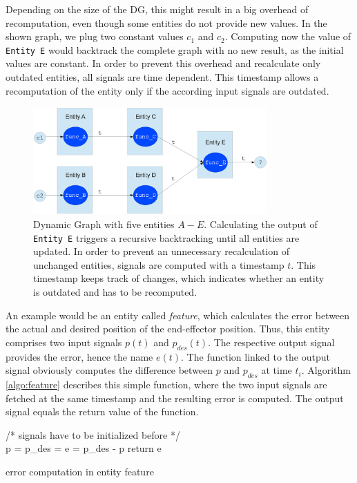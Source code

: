Depending on the size of the DG, this might result in a big overhead of recomputation, even though some entities do not provide new values. In the shown graph, we plug two constant values $c_1$ and $c_2$. Computing now the value of \verb|Entity E| would backtrack the complete graph with no new result, as the initial values are constant. In order to prevent this overhead and recalculate only outdated entities, all signals are time dependent. This timestamp allows a recomputation of the entity only if the according input signals are outdated. 
\begin{figure}[h!]
  \centering
    \includegraphics[width=0.8\textwidth]{../figures/dg.eps}
    \caption{Dynamic Graph with five entities $A-E$. Calculating the output of \texttt{Entity E} triggers a recursive backtracking until all entities are updated. In order to prevent an unnecessary recalculation of unchanged entities, signals are computed with a timestamp $t$. This timestamp keeps track of changes, which indicates whether an entity is outdated and has to be recomputed.}
    \label{fig:dg}
\end{figure}
\newpage
An example would be an entity called \textit{feature}, which calculates the error between the actual and desired position of the end-effector position. Thus, this entity comprises two input signals $p(t)$ and $p_{des}(t)$. The respective output signal provides the error, hence the name $e(t)$. The function linked to the output signal obviously computes the difference between $p$ and $p_{des}$ at time $t_i$. Algorithm \ref{algo:feature} describes this simple function, where the two input signals are fetched at the same timestamp and the resulting error is computed. The output signal equals the return value of the function.

\begin{algorithm}[]
\SetAlgoLined
{}
/* signals have to be initialized before */ \\
p =  \;
p\_des =  \;
e = p\_des - p \;
return e \;
\caption{error computation in entity feature}
\label{algo:feature}
\end{algorithm}

